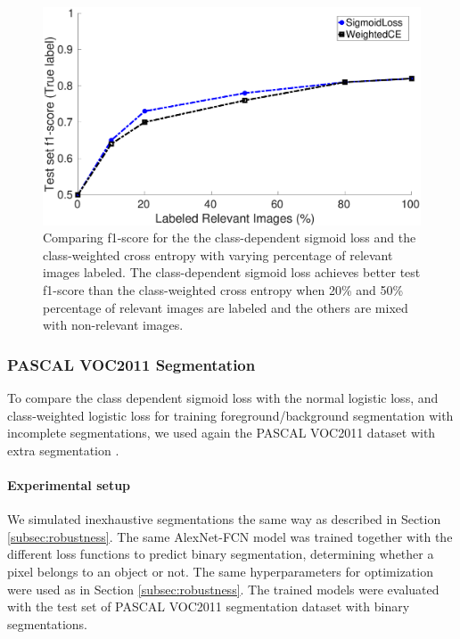 \begin{figure}[t]
\centering
   \includegraphics[width=1.05\linewidth]{img/pu_vs_pn}
\caption{
Comparing f1-score for the the class-dependent sigmoid loss and the class-weighted cross entropy with varying percentage of relevant images labeled.
The class-dependent sigmoid loss achieves better test f1-score than the class-weighted cross entropy when 20\% and 50\% percentage of relevant images are labeled and the others are mixed with non-relevant images.
}
\label{fig:pct_annotating}
\end{figure}


\subsubsection{PASCAL VOC2011 Segmentation}
To compare the class dependent sigmoid loss with the normal logistic loss, and class-weighted logistic loss for training foreground/background segmentation with incomplete segmentations, we used again the PASCAL VOC2011 dataset with extra segmentation \cite{hariharan2011semantic}.

\paragraph{Experimental setup}
We simulated inexhaustive segmentations the same way as described in Section \ref{subsec:robustness}.
The same AlexNet-FCN model was trained together with the different loss functions to predict binary segmentation, determining whether a pixel belongs to an object or not.
The same hyperparameters for optimization were used as in Section \ref{subsec:robustness}.
The trained models were evaluated with the test set of PASCAL VOC2011 segmentation dataset with binary segmentations.


